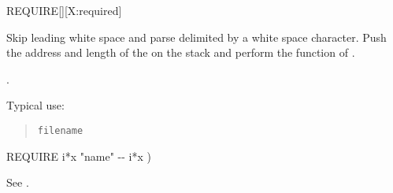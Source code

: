 \begin{worddef}{}{REQUIRE}[][X:required]
\item {}

	Skip leading white space and parse  delimited by a
	white space character. Push the address and length of the
	 on the stack and perform the function of
	.

\see {}.

	\begin{defer}
	\rationale
		Typical use:
		\begin{quote}
			 \texttt{filename}
		\end{quote}

	\implementation
		\word{:} REQUIRE  i*x "name" -{}- i*x ) \\
		\tab {}  \word{;}

	\testing*
		See .
	\end{defer}
\end{worddef}


